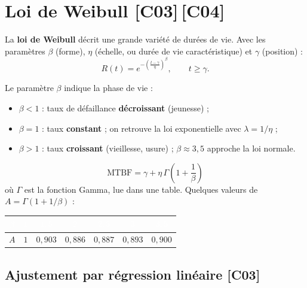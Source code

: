 \documentclass[a4paper,11pt]{article}
\begin{document}
\newpage
\section{Loi de Weibull \hfill {\normalsize\color{uimmred}[C03]\,[C04]}}

\begin{definition}
La \textbf{loi de Weibull} décrit une grande variété de durées de vie. Avec les paramètres $\beta$ (forme), $\eta$ (échelle, ou durée de vie caractéristique) et $\gamma$ (position) :
\[
\boxed{R(t) = e^{-\left(\frac{t - \gamma}{\eta}\right)^{\beta}}}, \qquad t \geq \gamma.
\]
\end{definition}

\begin{theoreme}
Le paramètre $\beta$ indique la phase de vie :
\begin{itemize}
  \item $\beta < 1$ : taux de défaillance \textbf{décroissant} (jeunesse) ;
  \item $\beta = 1$ : taux \textbf{constant} ; on retrouve la loi exponentielle avec $\lambda = 1/\eta$ ;
  \item $\beta > 1$ : taux \textbf{croissant} (vieillesse, usure) ; $\beta \approx 3{,}5$ approche la loi normale.
\end{itemize}
\end{theoreme}

\begin{theoreme}
\[
\text{MTBF} = \gamma + \eta\,\Gamma\!\left(1 + \frac{1}{\beta}\right)
\]
où $\Gamma$ est la fonction Gamma, lue dans une table. Quelques valeurs de $A = \Gamma(1 + 1/\beta)$ :
\renewcommand{\arraystretch}{1.3}
\begin{center}
\begin{tabular}{|c|c|c|c|c|c|c|}
\hline
\rowcolor{uimmblue}
\textcolor{white}{$\beta$} & \textcolor{white}{$1$} & \textcolor{white}{$1{,}5$} & \textcolor{white}{$2$} & \textcolor{white}{$2{,}5$} & \textcolor{white}{$3$} & \textcolor{white}{$3{,}5$} \\
\hline
$A$ & $1$ & $0{,}903$ & $0{,}886$ & $0{,}887$ & $0{,}893$ & $0{,}900$ \\
\hline
\end{tabular}
\end{center}
\end{theoreme}

\subsection{Ajustement par régression linéaire \hfill {\normalsize\color{uimmred}[C03]}}
\end{document}
